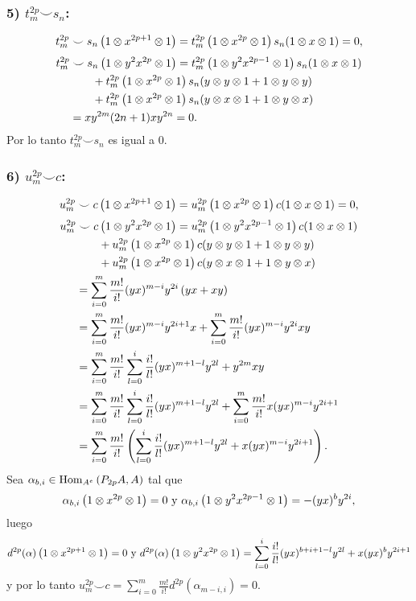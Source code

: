 \documentclass[fleqn,../tesis.tex]{subfiles}
\begin{document}
\subsubsection{5) $t_m^{2p} \smile s_n$:}
\begin{align*}
	t_m^{2p} \smile s_n\left(1 \otimes x^{2 p + 1}\otimes 1\right) = t_m^{2p}\left(1 \otimes x^{2p} \otimes 1\right)
		s_n(1 \otimes x \otimes 1) = 0,
\end{align*}
\begin{align*}
	t_m^{2p} &\smile s_n\left(1 \otimes y^2x^{2 p}\otimes 1\right) =
		t_m^{2p}\left(1 \otimes y^{2}x^{2p - 1}\otimes 1\right)s_n(1 \otimes x \otimes 1)\\
	&\qquad + t_m^{2p}\left(1 \otimes x^{2p} \otimes 1\right)s_n(y \otimes y \otimes 1 + 1 \otimes y \otimes y)\\
	&\qquad + t_m^{2p}\left(1 \otimes x^{2p} \otimes 1\right)s_n(y \otimes x \otimes 1 + 1 \otimes y \otimes x)\\
	&= xy^{2m}(2n + 1)xy^{2n} = 0.
\end{align*}
Por lo tanto $t_m^{2p} \smile s_n$ es igual a $0$.

\subsubsection{6) $u_m^{2p} \smile c$:}
\begin{align*}
	u_{m}^{2p} \smile c \left(1 \otimes x^{2p + 1} \otimes 1\right) = u_{m}^{2p}\left(1\otimes x^{2p} \otimes 1\right)c(1 \otimes x \otimes 1)
	=0,
\end{align*}
\begin{align*}
	u_{m}^{2p} &\smile c \left(1 \otimes y^2x^{2p} \otimes 1 \right) =
		u_m^{2p}\left(1 \otimes y^{2}x^{2p - 1}\otimes 1\right)c(1 \otimes x \otimes 1)\\
	&\qquad + u_m^{2p}\left(1 \otimes x^{2p} \otimes 1\right)c(y \otimes y \otimes 1 + 1 \otimes y \otimes y)\\
	&\qquad + u_m^{2p}\left(1 \otimes x^{2p} \otimes 1\right)c(y \otimes x \otimes 1 + 1 \otimes y \otimes x)\\
	&= \sum_{i = 0}^{m}\frac{m!}{i!}(yx)^{m - i}y^{2i}\left(yx + xy\right)\\
	&= \sum_{i = 0}^{m}\frac{m!}{i!}(yx)^{m - i}y^{2i + 1}x + \sum_{i = 0}^{m}\frac{m!}{i!}(yx)^{m - i}y^{2i}xy\\ 
	&= \sum_{i = 0}^{m}\frac{m!}{i!}\sum_{l = 0}^{i}\frac{i!}{l!}(yx)^{m + 1 - l}y^{2l} + y^{2m}xy\\
	&= \sum_{i = 0}^{m}\frac{m!}{i!}\sum_{l = 0}^{i}\frac{i!}{l!}(yx)^{m + 1 - l}y^{2l}
		+ \sum_{i = 0}^{m}\frac{m!}{i!}x(yx)^{m - i}y^{2i + 1}\\
	&= \sum_{i = 0}^{m}\frac{m!}{i!}\left(\sum_{l = 0}^{i}\frac{i!}{l!}(yx)^{m + 1 - l}y^{2l}
		+ x(yx)^{m - i}y^{2i + 1}\right).
\end{align*}
Sea $\alpha_{b, i} \in \operatorname{Hom}_{A^e}\left(P_{2p}A, A\right)$ tal que
\[
	\alpha_{b, i}\left(1 \otimes x^{2p} \otimes 1\right) = 0 \text{ y }
		\alpha_{b, i}\left(1 \otimes y^2x^{2p - 1}\otimes 1\right) = -(yx)^by^{2i},
\]
luego
\[
	d^{2p}(\alpha)\left(1 \otimes x^{2p + 1} \otimes 1\right) = 0 \text{ y }
d^{2p}(\alpha)\left(1 \otimes y^2x^{2p} \otimes 1\right) = \sum_{l = 0}^{i}\frac{i!}{l!}(yx)^{b + i + 1 - l}y^{2l}
		+ x(yx)^{b}y^{2i + 1}
\]
y por lo tanto $u_{m}^{2p} \smile c = \sum_{i =0}^{m}\frac{m!}{i!}d^{2p}\left(\alpha_{m - i, i}\right) = 0$.
\end{document}
